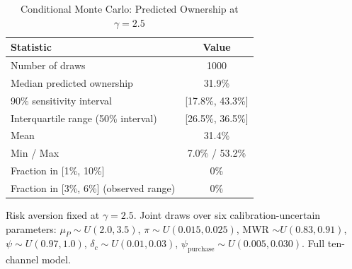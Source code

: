 \begin{table}[htbp]
\centering
\caption{Conditional Monte Carlo: Predicted Ownership at $\gamma = 2.5$}
\label{tab:monte_carlo}
\begin{tabular}{lc}
\toprule
Statistic & Value \\
\midrule
Number of draws & 1000 \\
Median predicted ownership & 31.9\% \\
90\% sensitivity interval & [17.8\%, 43.3\%] \\
Interquartile range (50\% interval) & [26.5\%, 36.5\%] \\
Mean & 31.4\% \\
Min / Max & 7.0\% / 53.2\% \\
Fraction in [1\%, 10\%] & 0\% \\
Fraction in [3\%, 6\%] (observed range) & 0\% \\
\bottomrule
\end{tabular}
\begin{tablenotes}
\small
\item Risk aversion fixed at $\gamma = 2.5$. Joint draws over six
calibration-uncertain parameters: $\mu_P \sim U(2.0, 3.5)$, $\pi \sim U(0.015, 0.025)$,
MWR $\sim U(0.83, 0.91)$, $\psi \sim U(0.97, 1.0)$, $\delta_c \sim U(0.01, 0.03)$,
$\psi_{\text{purchase}} \sim U(0.005, 0.030)$. Full ten-channel model.
\end{tablenotes}
\end{table}
